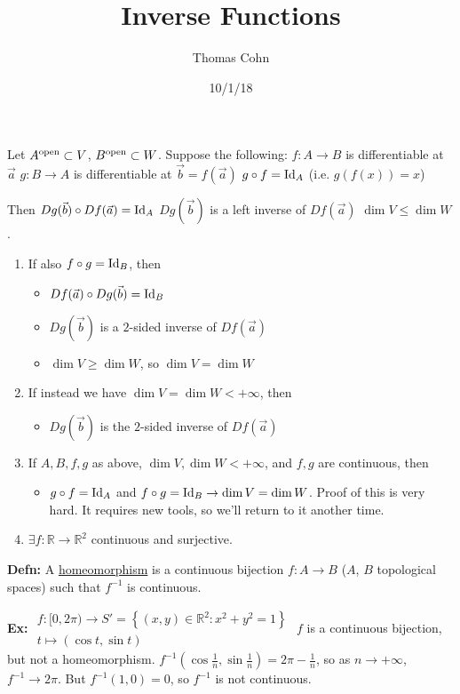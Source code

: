 \documentclass[10pt,letterpaper]{article}
\author{Thomas Cohn}
\title{Inverse Functions}
\date{10/1/18} %
\newcommand{\n}{\hfill\break}
\newcommand{\defn}[1]{\par\noindent\settowidth{\hangindent}{\textbf{Defn: }}\textbf{Defn: }#1\n}
\newcommand{\ex}[1]{\par\noindent\settowidth{\hangindent}{\textbf{Ex: }}\textbf{Ex: }#1\n}
\newcommand{\ptxt}[1]{\textrm{\textnormal{#1}}}
\newcommand{\set}[1]{\left\{#1\right\}}
\newcommand{\reals}{\mathbb{R}}
\newcommand{\R}{\reals}
\newcommand{\inv}{^{-1}}
\newcommand{\of}{\circ}
\newcommand{\Id}{\textrm{\textnormal{Id}}}
\begin{document}
\maketitle
\setlength\RaggedRightParindent{\parindent}
\RaggedRight

\par\noindent Let $A^{\ptxt{open}}\subset{}V$, $B^{\ptxt{open}}\subset{}W$. Suppose the following:\n
$f:A\to{}B$ is differentiable at $\vec{a}$\n
$g:B\to{}A$ is differentiable at $\vec{b}=f(\vec{a})$\n
$g\of{}f=\Id_{A}$ (i.e. $g(f(x))=x$)\n

\par\noindent Then $Dg(\vec{b})\of{}Df(\vec{a})=\Id_{A}$\n
$Dg(\vec{b})$ is a left inverse of $Df(\vec{a})$\n
$\dim{}V\le\dim{}W$.\n

\begin{enumerate}
	\item If also $f\of{}g=\Id_{B}$, then
	\begin{itemize}
		\item $Df(\vec{a})\of{}Dg(\vec{b})=\Id_{B}$
		\item $Dg(\vec{b})$ is a $2$-sided inverse of $Df(\vec{a})$
		\item $\dim{}V\ge\dim{}W$, so $\dim{}V=\dim{}W$
	\end{itemize}
	\item If instead we have $\dim{}V=\dim{}W<+\infty$, then
	\begin{itemize}
		\item $Dg(\vec{b})$ is  the $2$-sided inverse of $Df(\vec{a})$
	\end{itemize}
	\item If $A,B,f,g$ as above, $\dim{}V,\dim{}W<+\infty$, and $f,g$ are continuous, then
	\begin{itemize}
		\item $g\of{}f=\Id_{A}$ and $f\of{}g=\Id_{B}\to\dim{}V=\dim{}W$. Proof of this is very hard. It requires new tools, so we'll return to it another time.
	\end{itemize}
	\item $\exists{}f:\R\to\R^{2}$ continuous and surjective.
\end{enumerate}

\defn{A \underline{homeomorphism} is a continuous bijection $f:A\to{}B$ ($A$, $B$ topological spaces) such that $f\inv$ is continuous.}

\ex{$\begin{array}{l}f:[0,2\pi)\to{}S'=\set{(x,y)\in\R^{2}:x^{2}+y^{2}=1}\\ t\mapsto(\cos{}t,\sin{}t)\end{array}$\n
$f$ is a continuous bijection, but not a homeomorphism.\n
$f\inv\left(\cos\frac{1}{n},\sin\frac{1}{n}\right)=2\pi-\frac{1}{n}$, so as $n\to+\infty$, $f\inv\to{}2\pi$. But $f\inv(1,0)=0$, so $f\inv$ is not continuous.}
\end{document}
